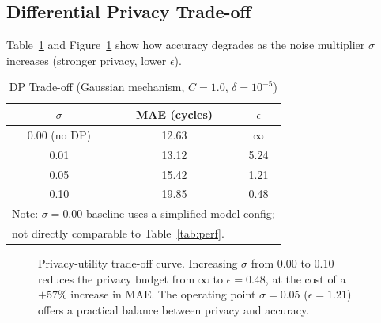 \documentclass[10pt, journal, letterpaper]{IEEEtran}
\begin{document}
\subsection{Differential Privacy Trade-off}

Table~\ref{tab:dp} and Figure~\ref{fig:dp_curve} show how accuracy degrades
as the noise multiplier $\sigma$ increases (stronger privacy, lower $\epsilon$).

\begin{table}[htbp]
\caption{DP Trade-off (Gaussian mechanism, $C=1.0$, $\delta=10^{-5}$)}
\label{tab:dp}
\centering\small
\begin{tabular}{ccc}
\toprule
$\sigma$ & \textbf{MAE (cycles)} & $\epsilon$ \\
\midrule
0.00 (no DP) & 12.63 & $\infty$ \\
0.01         & 13.12 & 5.24 \\
0.05         & 15.42 & 1.21 \\
0.10         & 19.85 & 0.48 \\
\bottomrule
\multicolumn{3}{l}{\footnotesize Note: $\sigma\!=\!0.00$ baseline uses a simplified model config;}\\
\multicolumn{3}{l}{\footnotesize not directly comparable to Table~\ref{tab:perf}.}
\end{tabular}
\end{table}

\begin{figure}[htbp]
\centering
{}
\caption{Privacy-utility trade-off curve. Increasing $\sigma$ from 0.00 to
0.10 reduces the privacy budget from $\infty$ to $\epsilon=0.48$, at the
cost of a $+57\%$ increase in MAE. The operating point $\sigma=0.05$
($\epsilon=1.21$) offers a practical balance between privacy and accuracy.}
\label{fig:dp_curve}
\end{figure}
\end{document}
